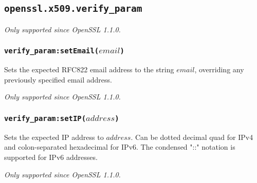 \documentclass[11pt, oneside]{memoir}
\newcommand*{\fn}[1]{\texttt{#1}\xspace}
\newcounter{toccols}
\newenvironment{Module}[1]{
	\subsection{\texttt{#1}}
	\addtocontents{toc}{
		\protect\begin{multicols}{\value{toccols}}
	}
}{
	\addtocontents{toc}{\protect\end{multicols}}
}
\begin{document}
\begin{Module}{openssl.x509.verify\_param}
\emph{Only supported since OpenSSL 1.1.0.}

\subsubsection[\fn{verify\_param:setEmail}]{\fn{verify\_param:setEmail($email$)}}

Sets the expected RFC822 email address to the string $email$, overriding any previously specified email address.

\emph{Only supported since OpenSSL 1.1.0.}

\subsubsection[\fn{verify\_param:setIP}]{\fn{verify\_param:setIP($address$)}}

Sets the expected IP address to $address$. Can be dotted decimal quad for IPv4 and colon-separated hexadecimal for IPv6. The condensed "::" notation is supported for IPv6 addresses.

\emph{Only supported since OpenSSL 1.1.0.}

\end{Module}
\end{document}
